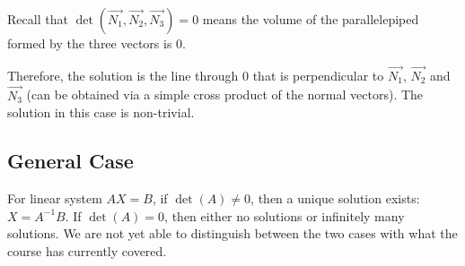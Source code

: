 \documentclass[12pt]{article}
\theoremstyle{definition}
\begin{document}
	Recall that $\det(\vec{N_1}, \vec{N_2}, \vec{N_3}) = 0$ means the volume of the parallelepiped formed by the three vectors is $0$.
	
	Therefore, the solution is the line through $0$ that is perpendicular to $\vec{N_1}$, $\vec{N_2}$ and $\vec{N_3}$ (can be obtained via a simple cross product of the normal vectors). The solution in this case is non-trivial.
	
	\subsection{General Case}
	
	For linear system $AX = B$, if $\det(A) \neq 0$, then a unique solution exists: $X = A^{-1}B$. If $\det(A) = 0$, then either no solutions or infinitely many solutions. We are not yet able to distinguish between the two cases with what the course has currently covered.
	
\end{document}
